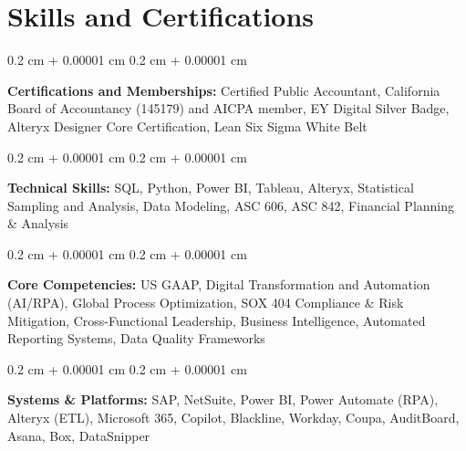 \documentclass[10pt, letterpaper]{article}
\newenvironment{onecolentry}{
    \begin{adjustwidth}{
        0.2 cm + 0.00001 cm
    }{
        0.2 cm + 0.00001 cm
    }
}{
    \end{adjustwidth}
} %
\begin{document}
    
    \section{Skills and Certifications}

        \begin{onecolentry}
            \textbf{Certifications and Memberships:} Certified Public Accountant, California Board of Accountancy (145179) and AICPA member, EY Digital Silver Badge, Alteryx Designer Core Certification, Lean Six Sigma White Belt
        \end{onecolentry}

        \vspace{0.2 cm}

        \begin{onecolentry}
            \textbf{Technical Skills:} SQL, Python, Power BI, Tableau, Alteryx, Statistical Sampling and Analysis, Data Modeling, ASC 606, ASC 842, Financial Planning \& Analysis
        \end{onecolentry}

        \vspace{0.2 cm}

        \begin{onecolentry}
            \textbf{Core Competencies:} US GAAP, Digital Transformation and Automation (AI/RPA), Global Process Optimization, SOX 404 Compliance \& Risk Mitigation, Cross-Functional Leadership, Business Intelligence, Automated Reporting Systems, Data Quality Frameworks
        \end{onecolentry}

        \vspace{0.2 cm}

        \begin{onecolentry}
            \textbf{Systems \& Platforms:} SAP, NetSuite, Power BI, Power Automate (RPA), Alteryx (ETL), Microsoft 365, Copilot, Blackline, Workday, Coupa, AuditBoard, Asana, Box, DataSnipper
        \end{onecolentry}
\end{document}
